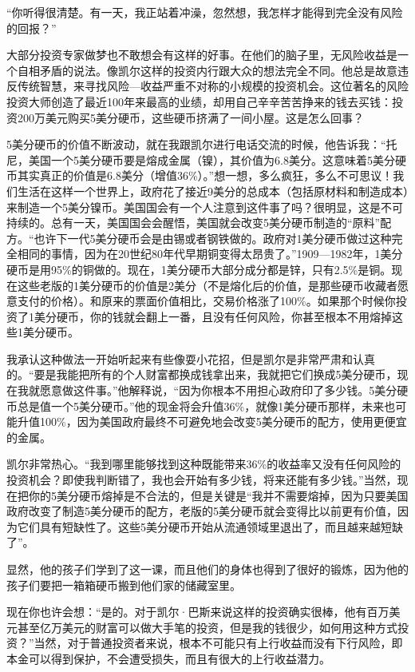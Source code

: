 “你听得很清楚。有一天，我正站着冲澡，忽然想，我怎样才能得到完全没有风险的回报？”

大部分投资专家做梦也不敢想会有这样的好事。在他们的脑子里，无风险收益是一个自相矛盾的说法。像凯尔这样的投资内行跟大众的想法完全不同。他总是故意违反传统智慧，来寻找风险—收益严重不对称的小规模的投资机会。这位著名的风险投资大师创造了最近100年来最高的业绩，却用自己辛辛苦苦挣来的钱去买钱：投资200万美元购买5美分硬币，这些硬币挤满了一间小屋。这是怎么回事？

5美分硬币的价值不断波动，就在我跟凯尔进行电话交流的时候，他告诉我：“托尼，美国一个5美分硬币要是熔成金属（镍），其价值为6.8美分。这意味着5美分硬币其实真正的价值是6.8美分（增值36\%）。”想一想，多么疯狂，多么不可思议！我们生活在这样一个世界上，政府花了接近9美分的总成本（包括原材料和制造成本）来制造一个5美分镍币。美国国会有一个人注意到这件事了吗？很明显，这是不可持续的。总有一天，美国国会会醒悟，美国就会改变5美分硬币制造的“原料”配方。“也许下一代5美分硬币会是由锡或者钢铁做的。政府对1美分硬币做过这种完全相同的事情，因为在20世纪80年代早期铜变得太昂贵了。”1909—1982年，1美分硬币是用95\%的铜做的。现在，1美分硬币大部分成分都是锌，只有2.5\%是铜。现在这些老版的1美分硬币的价值是2美分（不是熔化后的价值，是那些硬币收藏者愿意支付的价格）。和原来的票面价值相比，交易价格涨了100\%。如果那个时候你投资了1美分硬币，你的钱就会翻上一番，且没有任何风险，你甚至根本不用熔掉这些1美分硬币。

我承认这种做法一开始听起来有些像耍小花招，但是凯尔是非常严肃和认真的。“要是我能把所有的个人财富都换成钱拿出来，我就把它们换成5美分硬币，现在我就愿意做这件事。”他解释说，“因为你根本不用担心政府印了多少钱。5美分硬币总是值一个5美分硬币。”他的现金将会升值36\%，就像1美分硬币那样，未来也可能升值100\%，因为美国政府最终不可避免地会改变5美分硬币的配方，使用更便宜的金属。

凯尔非常热心。“我到哪里能够找到这种既能带来36\%的收益率又没有任何风险的投资机会？即使我判断错了，我也会开始有多少钱，将来还能有多少钱。”当然，现在把你的5美分硬币熔掉是不合法的，但是关键是“我并不需要熔掉，因为只要美国政府改变了制造5美分硬币的配方，老版的5美分硬币就会变得比以前更有价值，因为它们具有短缺性了。这些5美分硬币开始从流通领域里退出了，而且越来越短缺了”。

显然，他的孩子们学到了这一课，而且他们的身体也得到了很好的锻炼，因为他的孩子们要把一箱箱硬币搬到他们家的储藏室里。

现在你也许会想：“是的。对于凯尔·巴斯来说这样的投资确实很棒，他有百万美元甚至亿万美元的财富可以做大手笔的投资，但是我的钱很少，如何用这种方式投资？”当然，对于普通投资者来说，根本不可能只有上行收益而没有下行风险，即本金可以得到保护，不会遭受损失，而且有很大的上行收益潜力。

